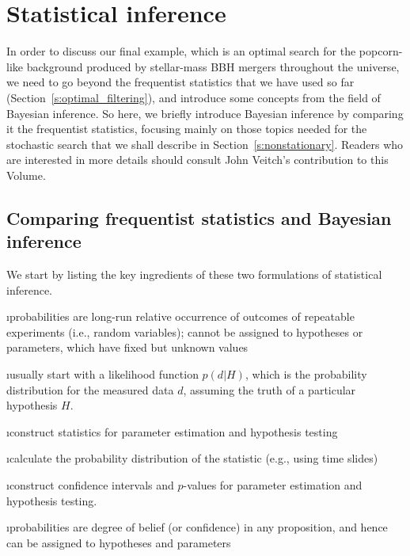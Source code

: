 \section{Statistical inference}
\label{s:statistical_inference}

In order to discuss our final example, which is an
optimal search for the popcorn-like background
produced by stellar-mass BBH mergers throughout the 
universe, we need to go beyond the frequentist 
statistics that we have used so far 
(Section~\ref{s:optimal_filtering}), 
and introduce some concepts from the field of Bayesian inference.
So here, we briefly introduce Bayesian inference by comparing 
it the frequentist 
statistics, focusing mainly on those topics needed for 
the stochastic search that we shall describe in
Section~\ref{s:nonstationary}.
Readers who are interested in more details should 
consult John Veitch's contribution to this Volume.

\subsection{Comparing frequentist statistics and Bayesian inference}

We start by listing the key ingredients of these two formulations 
of statistical inference.
\medskip


\bi

\i probabilities are long-run relative occurrence of 
outcomes of repeatable experiments (i.e., random variables);
cannot be assigned to hypotheses or parameters, 
which have fixed but unknown values

\i usually start with a likelihood function $p(d|H)$,
which is the probability distribution for the 
measured data $d$, assuming the truth of a particular
hypothesis $H$.

\i construct statistics for parameter estimation and
hypothesis testing

\i calculate the probability distribution of the 
statistic (e.g., using time slides)

\i construct confidence intervals and $p$-values for 
parameter estimation and hypothesis testing.

\ei


\bi

\i probabilities are degree of belief (or confidence)
in any proposition, and hence 
can be assigned to hypotheses and parameters

